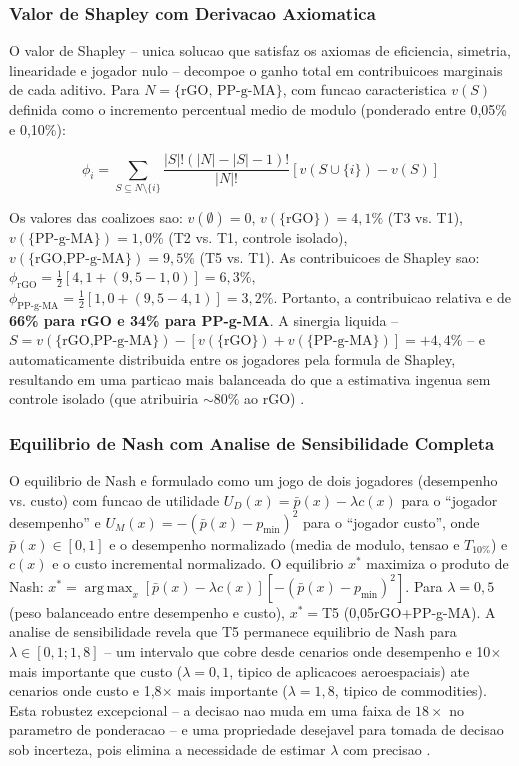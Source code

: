 \documentclass[11pt,a4paper,oneside]{article}
\DeclareMathOperator*{\argmax}{arg\,max}
\begin{document}
\subsubsection{Valor de Shapley com Derivacao Axiomatica}

O valor de Shapley \cite{Shapley1953} -- unica solucao que satisfaz os axiomas de eficiencia, simetria, linearidade e jogador nulo -- decompoe o ganho total em contribuicoes marginais de cada aditivo. Para $N{=}\{\text{rGO, PP-g-MA}\}$, com funcao caracteristica $v(S)$ definida como o incremento percentual medio de modulo (ponderado entre 0,05\% e 0,10\%):

\begin{equation}
\phi_i = \sum_{S\subseteq N\setminus\{i\}} \frac{|S|!(|N|-|S|-1)!}{|N|!}[v(S\cup\{i\}) - v(S)]
\label{eq:shapley_deriv}
\end{equation}

Os valores das coalizoes sao: $v(\emptyset){=}0$, $v(\{\text{rGO}\}){=}4{,}1\%$ (T3 vs. T1), $v(\{\text{PP-g-MA}\}){=}1{,}0\%$ (T2 vs. T1, controle isolado), $v(\{\text{rGO,PP-g-MA}\}){=}9{,}5\%$ (T5 vs. T1). As contribuicoes de Shapley sao: $\phi_{\text{rGO}}{=}\frac{1}{2}[4{,}1{+}(9{,}5{-}1{,}0)]{=}6{,}3\%$, $\phi_{\text{PP-g-MA}}{=}\frac{1}{2}[1{,}0{+}(9{,}5{-}4{,}1)]{=}3{,}2\%$. Portanto, a contribuicao relativa e de {\bfseries 66\% para rGO e 34\% para PP-g-MA}. A sinergia liquida -- $S{=}v(\{\text{rGO,PP-g-MA}\}){-}[v(\{\text{rGO}\}){+}v(\{\text{PP-g-MA}\})]{=}{+}4{,}4\%$ -- e automaticamente distribuida entre os jogadores pela formula de Shapley, resultando em uma particao mais balanceada do que a estimativa ingenua sem controle isolado (que atribuiria ${\sim}80\%$ ao rGO) \cite{Shapley1953}.

\subsubsection{Equilibrio de Nash com Analise de Sensibilidade Completa}

O equilibrio de Nash \cite{Nash1950} e formulado como um jogo de dois jogadores (desempenho vs. custo) com funcao de utilidade $U_D(x){=}\bar{p}(x){-}\lambda c(x)$ para o ``jogador desempenho'' e $U_M(x){=}{-}(\bar{p}(x){-}p_{\min})^2$ para o ``jogador custo'', onde $\bar{p}(x)\in[0{,}1]$ e o desempenho normalizado (media de modulo, tensao e $T_{10\%}$) e $c(x)$ e o custo incremental normalizado. O equilibrio $x^*$ maximiza o produto de Nash: $x^*{=}\argmax_x [\bar{p}(x){-}\lambda c(x)][{-}(\bar{p}(x){-}p_{\min})^2]$. Para $\lambda{=}0{,}5$ (peso balanceado entre desempenho e custo), $x^*{=}$T5 (0,05rGO+PP-g-MA). A analise de sensibilidade revela que T5 permanece equilibrio de Nash para $\lambda{\in}[0{,}1;1{,}8]$ -- um intervalo que cobre desde cenarios onde desempenho e 10$\times$ mais importante que custo ($\lambda{=}0{,}1$, tipico de aplicacoes aeroespaciais) ate cenarios onde custo e 1,8$\times$ mais importante ($\lambda{=}1{,}8$, tipico de commodities). Esta robustez excepcional -- a decisao nao muda em uma faixa de $18{\times}$ no parametro de ponderacao -- e uma propriedade desejavel para tomada de decisao sob incerteza, pois elimina a necessidade de estimar $\lambda$ com precisao \cite{Myerson1991}.
\end{document}
